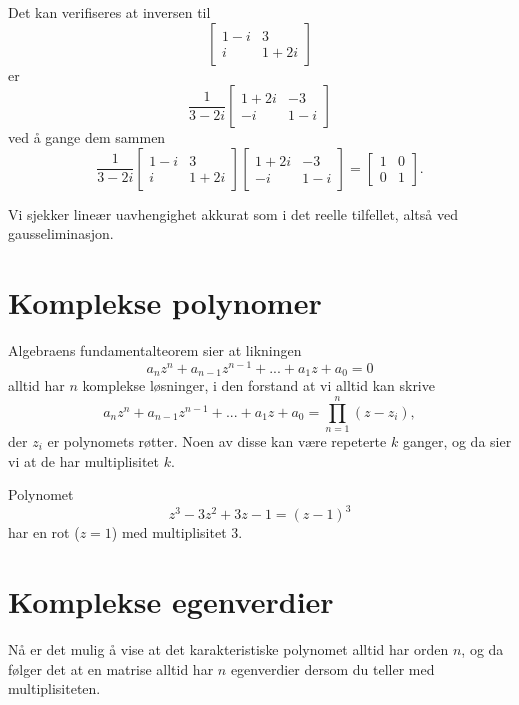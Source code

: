 \begin{ex}
Det kan verifiseres at inversen til 
\[
\begin{bmatrix}
1-i & 3  \\ i &1+2i 
\end{bmatrix}
\]
er
\[
\frac{1}{3-2i}
\begin{bmatrix}
1+2i & -3  \\ -i &1-i 
\end{bmatrix}
\]
ved å gange dem sammen
\[
\frac{1}{3-2i}
\begin{bmatrix}
1-i & 3  \\ i &1+2i 
\end{bmatrix}
\begin{bmatrix}
1+2i & -3  \\ -i &1-i 
\end{bmatrix}
=
\begin{bmatrix}
1 & 0  \\ 0 &1 
\end{bmatrix}.
\]


\end{ex}

\begin{ex}
Vi sjekker lineær uavhengighet akkurat som i det reelle tilfellet, altså ved gausseliminasjon.
\end{ex}



\section*{Komplekse polynomer}

Algebraens fundamentalteorem sier at likningen
\[
a_nz^n+a_{n-1}z^{n-1}+...+a_1z+a_0=0
\]
alltid har $n$ komplekse løsninger, i den forstand at vi alltid kan skrive
\[
a_nz^n+a_{n-1}z^{n-1}+...+a_1z+a_0=\prod_{n=1}^n (z-z_i),
\]
der $z_i$ er polynomets røtter. Noen av disse kan være repeterte $k$ ganger, og da sier vi at de har multiplisitet $k$. 

\begin{ex}
Polynomet 
\[
z^3-3z^2+3z-1=(z-1)^3
\]
har en rot ($z=1$) med multiplisitet 3.
\end{ex}

\section*{Komplekse egenverdier}


Nå er det mulig å vise at det karakteristiske polynomet alltid har orden $n$, 
og da følger det at en matrise alltid har $n$ egenverdier dersom du 
teller med multiplisiteten. 

